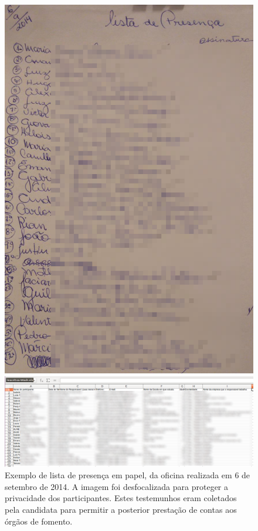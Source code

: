 \documentclass[
12pt,		%
openright,	%
twoside,  %
a4paper,			%
chapter=TITLE,		%
english,			%
french,				%
spanish,			%
brazil				%
]{USPSC-classe/USPSC}
\begin{document}
\begin{figure}[max size={\textwidth}{\textheight}]
\begin{minipage}[b]{0.4\linewidth}
        \centering
                \includegraphics[width=1.0\linewidth]{../../imagens/blurred-Presenca-Oficina-2014-09-06.jpeg}
                \caption{Exemplo de lista de presen\c{c}a em papel, da oficina realizada em 6 de setembro de 2014. A imagem foi desfocalizada para proteger a privacidade dos participantes. Estes testemunhos eram coletados pela candidata para permitir a posterior presta\c{c}\~ao de contas aos \'org\~aos de fomento.}
                \label{9a8c04c719fc4f9811165547ded35a00eb4fbeed}
\end{minipage}
\hspace{0.5cm}
\begin{minipage}[b]{0.4\linewidth}
        \centering
                \includegraphics[width=1.0\linewidth]{../../imagens/blurred-planilha2.png}

\end{minipage}
\end{figure}
\end{document}
